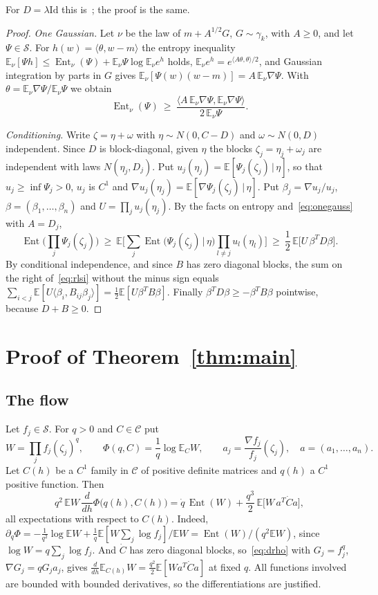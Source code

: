 \documentclass[11pt]{amsart}
\theoremstyle{definition}
\newcommand{\E}{\mathbb{E}}
\newcommand{\Ent}{\operatorname{Ent}}
\newcommand{\cS}{\mathcal{S}}
\newcommand{\Id}{\mathrm{Id}}
\begin{document}
For $D=\lambda\Id$ this is~\cite[Lemma~1.6]{FR}; the proof is the same.

\begin{proof}
\emph{One Gaussian.} Let $\nu$ be the law of $m+A^{1/2}G$, $G\sim\gamma_k$, with $A\ge0$, and let $\Psi\in\cS$. For
$h(w)=\langle\theta,w-m\rangle$ the entropy inequality $\E_\nu[\Psi h]\le\Ent_\nu(\Psi)+\E_\nu\Psi\log\E_\nu e^h$
holds, $\E_\nu e^h=e^{\langle A\theta,\theta\rangle/2}$, and Gaussian integration by parts in $G$ gives
$\E_\nu[\Psi(w)(w-m)]=A\,\E_\nu\nabla\Psi$. With $\theta=\E_\nu\nabla\Psi/\E_\nu\Psi$ we obtain
\begin{equation}\label{eq:onegauss}
\Ent_\nu(\Psi)\ \ge\ \frac{\langle A\,\E_\nu\nabla\Psi,\E_\nu\nabla\Psi\rangle}{2\,\E_\nu\Psi}.
\end{equation}

\emph{Conditioning.} Write $\zeta=\eta+\omega$ with $\eta\sim N(0,C-D)$ and $\omega\sim N(0,D)$ independent. Since $D$
is block-diagonal, given $\eta$ the blocks $\zeta_j=\eta_j+\omega_j$ are independent with laws $N(\eta_j,D_j)$. Put
$u_j(\eta_j)=\E[\Psi_j(\zeta_j)\,|\,\eta]$, so that $u_j\ge\inf\Psi_j>0$, $u_j$ is $C^1$ and
$\nabla u_j(\eta_j)=\E[\nabla\Psi_j(\zeta_j)\,|\,\eta]$. Put $\beta_j=\nabla u_j/u_j$, $\beta=(\beta_1,\dots,\beta_n)$
and $U=\prod_ju_j(\eta_j)$. By the facts on entropy and~\eqref{eq:onegauss} with $A=D_j$,
\[
\Ent\Big(\prod_j\Psi_j(\zeta_j)\Big)\ \ge\ \E\Big[\sum_j\Ent\big(\Psi_j(\zeta_j)\,\big|\,\eta\big)\prod_{l\ne j}u_l(\eta_l)\Big]
\ \ge\ \frac12\,\E\big[U\,\beta^TD\beta\big].
\]
By conditional independence, and since $B$ has zero diagonal blocks, the sum on the right of~\eqref{eq:rlsi} without
the minus sign equals $\sum_{i<j}\E[U\langle\beta_i,B_{ij}\beta_j\rangle]=\frac12\E[U\beta^TB\beta]$. Finally
$\beta^TD\beta\ge-\beta^TB\beta$ pointwise, because $D+B\ge0$.
\end{proof}

\section{Proof of Theorem~\ref{thm:main}}
\subsection{The flow}
Let $f_j\in\cS$. For $q>0$ and $C\in\mathcal C$ put
\[
W=\prod_jf_j(\zeta_j)^q,\qquad\Phi(q,C)=\frac1q\log\E_CW,\qquad a_j=\frac{\nabla f_j}{f_j}(\zeta_j),\quad
a=(a_1,\dots,a_n).
\]
Let $C(h)$ be a $C^1$ family in $\mathcal C$ of positive definite matrices and $q(h)$ a $C^1$ positive function. Then
\begin{equation}\label{eq:deriv}
q^2\,\E W\,\frac{d}{dh}\Phi\big(q(h),C(h)\big)=\dot q\,\Ent(W)+\frac{q^3}2\,\E\big[W\,a^T\dot C a\big],
\end{equation}
all expectations with respect to $C(h)$. Indeed,
$\partial_q\Phi=-\frac1{q^2}\log\E W+\frac1q\E[W\sum_j\log f_j]/\E W=\Ent(W)/(q^2\E W)$, since
$\log W=q\sum_j\log f_j$. And $\dot C$ has zero diagonal blocks, so~\eqref{eq:drho} with $G_j=f_j^q$,
$\nabla G_j=qG_ja_j$, gives $\frac{d}{dh}\E_{C(h)}W=\frac{q^2}2\E[Wa^T\dot Ca]$ at fixed $q$. All functions involved
are bounded with bounded derivatives, so the differentiations are justified.
\end{document}
